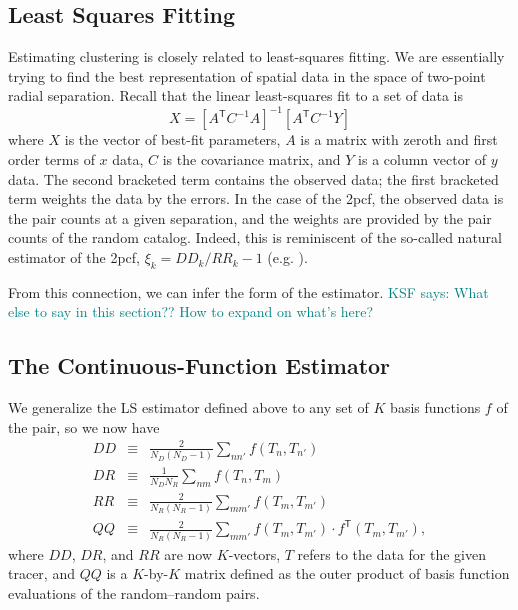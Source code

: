 \documentclass[modern]{aastex62}
\newcommand{\cf}{2pcf\xspace} %
\newcommand{\Est}{The Continuous-Function Estimator\xspace}
\newcommand{\LS}{LS\xspace}
\newcommand{\inv}{^{-1}}
\newcommand{\T}{^{\mathsf{T}}}
\newcommand{\KSF}[1]{\textcolor{teal}{KSF says: #1}}
\begin{document}
\subsection{Least Squares Fitting}

Estimating clustering is closely related to least-squares fitting.
We are essentially trying to find the best representation of spatial data in the space of two-point radial separation.
Recall that the linear least-squares fit to a set of data is
\begin{equation}
X = [A\T C\inv A]\inv [A\T C\inv Y]
\end{equation}
where $X$ is the vector of best-fit parameters, $A$ is a matrix with zeroth and first order terms of $x$ data, $C$ is the covariance matrix, and $Y$ is a column vector of $y$ data.
The second bracketed term contains the observed data; the first bracketed term weights the data by the errors.
In the case of the \cf, the observed data is the pair counts at a given separation, and the weights are provided by the pair counts of the random catalog.
Indeed, this is reminiscent of the so-called natural estimator of the \cf, $\xi_k = DD_k/RR_k - 1$ (e.g. \citealt{Kerscher2000}).

From this connection, we can infer the form of the estimator.
\KSF{What else to say in this section?? How to expand on what's here?}

\subsection{\Est}
\label{sec:est}

We generalize the \LS estimator defined above to any set of $K$ basis functions $f$ of the pair, so we now have
\begin{eqnarray}\displaystyle
DD &\equiv& \frac{2}{N_D(N_D-1)} \sum_{n n'} f(T_n, T_{n'}) \\
DR &\equiv& \frac{1}{N_D N_R} \sum_{n m} f(T_n, T_{m}) \\
RR &\equiv& \frac{2}{N_R(N_R-1)} \sum_{m m'} f(T_m, T_{m'}) \\
QQ &\equiv& \frac{2}{N_R(N_R-1)} \sum_{m m'} f(T_m, T_{m'}) \cdot f\T(T_m, T_{m'}), \label{eq:qq_proj}
\end{eqnarray}
where $DD$, $DR$, and $RR$ are now $K$-vectors, $T$ refers to the data for the given tracer, and $QQ$ is a $K$-by-$K$ matrix defined as the outer product of basis function evaluations of the random--random pairs.
\end{document}
